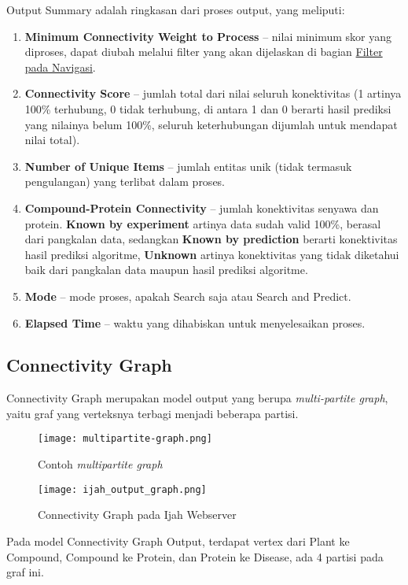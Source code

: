 	Output Summary adalah ringkasan dari proses output, yang meliputi:
	\begin{enumerate}
	\item \textbf{Minimum Connectivity Weight to Process} -- nilai minimum skor yang diproses, dapat diubah melalui filter yang akan dijelaskan di bagian \hyperref[nav]{Filter pada Navigasi}.
	\item \textbf{Connectivity Score} -- jumlah total dari nilai seluruh konektivitas (1 artinya 100\% terhubung, 0 tidak terhubung, di antara 1 dan 0 berarti hasil prediksi yang nilainya belum 100\%, seluruh keterhubungan dijumlah untuk mendapat nilai total).
	\item \textbf{Number of Unique Items} -- jumlah entitas unik (tidak termasuk pengulangan) yang terlibat dalam proses.
	\item \textbf{Compound-Protein Connectivity} -- jumlah konektivitas senyawa dan protein. \textbf{Known by experiment} artinya data sudah valid 100\%, berasal dari pangkalan data, sedangkan \textbf{Known by prediction} berarti konektivitas hasil prediksi algoritme, \textbf{Unknown} artinya konektivitas yang tidak diketahui baik dari pangkalan data maupun hasil prediksi algoritme.
	\item \textbf{Mode} -- mode proses, apakah Search saja atau Search and Predict.
	\item \textbf{Elapsed Time} -- waktu yang dihabiskan untuk menyelesaikan proses.
	\end{enumerate}
	
	\subsection{Connectivity Graph} \label{graph}
	Connectivity Graph merupakan model output yang berupa \emph{multi-partite graph}, yaitu graf yang verteksnya terbagi menjadi beberapa partisi.

	\begin{figure}[H]
	\centering
	\texttt{[image: multipartite-graph.png]}
	\caption{Contoh \emph{multipartite graph}}
	\label{fig:multipartite-graph}
	\end{figure}

	\begin{figure}[H]
	\centering
	\texttt{[image: ijah\_output\_graph.png]}
	\caption{Connectivity Graph pada Ijah Webserver}
	\label{fig:ijah_output_graph}
	\end{figure}
	
	Pada model Connectivity Graph Output, terdapat vertex dari Plant ke Compound, Compound ke Protein, dan Protein ke Disease, ada 4 partisi pada graf ini.

